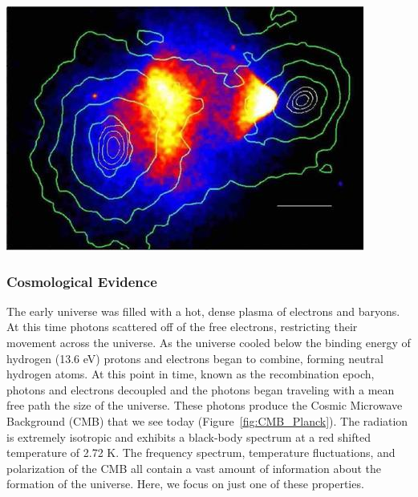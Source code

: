 \begin{center} \label{bulletcluster}
\includegraphics[scale=1]{bulletcluster.jpg}
\end{center}
 

\subsubsection{Cosmological Evidence}

The early universe was filled with a hot, dense plasma of electrons and baryons.  At this time photons scattered off of the free electrons, restricting their movement across the universe.  As the universe cooled below the binding energy of hydrogen (13.6 eV) protons and electrons began to combine, forming neutral hydrogen atoms.  At this point in time, known as the recombination epoch,  photons and electrons decoupled and the photons began traveling with a mean free path the size of the universe.  These photons produce the Cosmic Microwave Background (CMB) that we see today (Figure~\ref{fig:CMB_Planck}).  The radiation is extremely isotropic and exhibits a black-body spectrum at a red shifted temperature of 2.72 K.  The frequency spectrum, temperature fluctuations, and polarization of the CMB all contain a vast amount of information about the formation of the universe.  Here, we focus on just one of these properties. 



